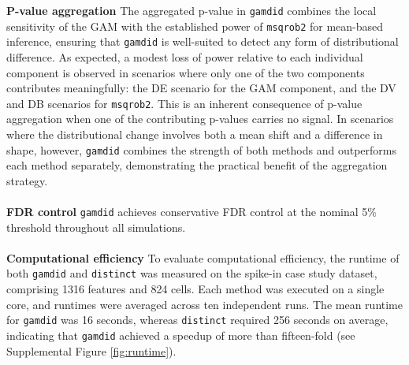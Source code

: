 \textbf{P-value aggregation}
The aggregated p-value in \texttt{gamdid} combines the local sensitivity of the GAM with the established power of \texttt{msqrob2} for mean-based inference, ensuring that \texttt{gamdid} is well-suited to detect any form of distributional difference. As expected, a modest loss of power relative to each individual component is observed in scenarios where only one of the two components contributes meaningfully: the DE scenario for the GAM component, and the DV and DB scenarios for \texttt{msqrob2}. This is an inherent consequence of p-value aggregation when one of the contributing p-values carries no signal. In scenarios where the distributional change involves both a mean shift and a difference in shape, however, \texttt{gamdid} combines the strength of both methods and outperforms each method separately, demonstrating the practical benefit of the aggregation strategy.
\\
\\
\textbf{FDR control}
\texttt{gamdid} achieves conservative FDR control at the nominal 5\% threshold throughout all simulations.
\\
\\
\textbf{Computational efficiency}
To evaluate computational efficiency, the runtime of both \texttt{gamdid} and \texttt{distinct} was measured on the spike-in case study dataset, comprising 1316 features and 824 cells. Each method was executed on a single core, and runtimes were averaged across ten independent runs. The mean runtime for \texttt{gamdid} was 16 seconds, whereas \texttt{distinct} required 256 seconds on average, indicating that \texttt{gamdid} achieved a speedup of more than fifteen-fold (see Supplemental Figure \ref{fig:runtime}).


